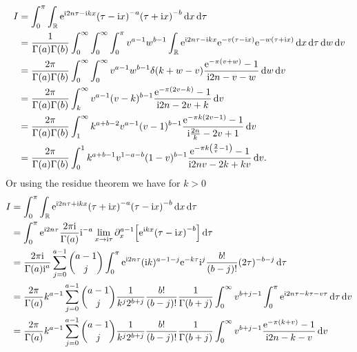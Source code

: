 \documentclass[english, parskip=full]{scrartcl}
\begin{document}
\begin{align}
I &= \intx{0}{\pi}{\intr{\powe{\i 2n\tau - \i kx} \kla*{\tau-\i x}^{-a} \kla*{\tau+\i x}^{-b}}{x} }{\tau}\\
&= \frac{1}{\Gamma(a)\Gamma(b) }\intx{0}{\infty}{\intx{0}{\infty}{\intx{0}{\pi}{ v^{a-1} w^{b-1} \intr{\powe{\i 2n\tau - \i kx} \powe{-v(\tau - \i x)} \powe{-w(\tau + \i x)}}{x} }{\tau}}{w}}{v}\\
&= \frac{2\pi}{\Gamma(a)\Gamma(b) }\intx{0}{\infty}{\intx{0}{\infty}{v^{a-1} w^{b-1} \delta\kla*{k+w-v} \frac{\powe{-\pi (v+w)} - 1}{\i 2n - v - w}}{w}}{v}\\
&= \frac{2\pi}{\Gamma(a)\Gamma(b) }\intx{k}{\infty}{v^{a-1} (v-k)^{b-1} \frac{\powe{-\pi (2v-k)} - 1}{\i 2n - 2v+k}}{v}\\
&= \frac{2\pi}{\Gamma(a) \Gamma(b)} \intx{1}{\infty}{ k^{a+b-2} v^{a-1} (v-1)^{b-1} \frac{\powe{-\pi k (2v-1)} - 1}{\i \frac{2n}{k} - 2v + 1}}{v}\\
&= \frac{2\pi}{\Gamma(a) \Gamma(b)} \intx{0}{1}{ k^{a+b-1} v^{1-a-b} (1-v)^{b-1} \frac{\powe{-\pi k \kla*{\frac{2}{v}-1}} - 1}{\i 2nv - 2k + kv}}{v}.
\end{align}
Or using the residue theorem we have for $k>0$
\begin{align}
I &= \intx{0}{\pi}{\intr{\powe{\i 2n\tau + \i kx} \kla*{\tau+\i x}^{-a} \kla*{\tau-\i x}^{-b}}{x} }{\tau}\\
&= \intx{0}{\pi}{\powe{\i 2n\tau} \frac{2\pi\i}{\Gamma(a)} \i^{-a} \lim_{x\rightarrow\i\tau} \partial_x^{a-1} \klb*{\powe{\i kx} \kla*{\tau - \i x}^{-b}} }{\tau}\\
&= \frac{2\pi\i}{\Gamma(a)\i^a} \sum_{j=0}^{a-1} \binom{a-1}{j} \intx{0}{\pi}{\powe{\i 2n\tau} (\i k)^{a-1-j} \powe{-k\tau} \i^{j} \frac{b!}{(b-j)!} (2\tau)^{-b-j} }{\tau}\\
&= \frac{2\pi}{\Gamma(a)} k^{a-1} \sum_{j=0}^{a-1} \binom{a-1}{j} \frac{1}{k^j 2^{b+j}} \frac{b!}{(b-j)!} \frac{1}{\Gamma(b+j)} \intx{0}{\infty}{v^{b+j-1} \intx{0}{\pi}{\powe{\i 2n\tau - k\tau - v\tau}}{\tau}  }{v}\\
&= \frac{2\pi}{\Gamma(a)} k^{a-1} \sum_{j=0}^{a-1} \binom{a-1}{j} \frac{1}{k^j 2^{b+j}} \frac{b!}{(b-j)!} \frac{1}{\Gamma(b+j)} \intx{0}{\infty}{v^{b+j-1} \frac{\powe{-\pi (k+v)} - 1}{\i 2n - k - v}  }{v}
\end{align}

\end{document}
